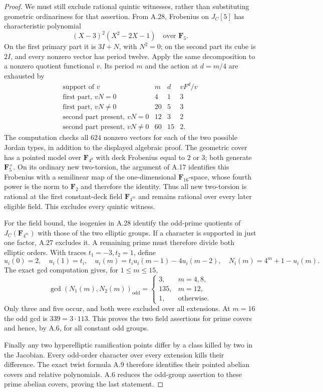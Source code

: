 \documentclass[11pt]{article}
\begin{document}
\begin{proof}
We must still exclude rational quintic witnesses, rather than
substituting geometric ordinariness for that assertion.  From A.28,
Frobenius on $J_C[5]$ has characteristic polynomial
\[
                   (X-3)^2(X^2-2X-1)\quad\text{over }\mathbf F_5.
\]
On the first primary part it is $3I+N$, with $N^2=0$; on the second
part its cube is $2I$, and every nonzero vector has period twelve.
Apply the same decomposition to a nonzero quotient functional $v$.
Its period $m$ and the action at $d=m/4$ are exhausted by
\[
 \begin{array}{c|c|c|c}
 \text{support of }v&m&d&vF^d/v\\\hline
 \text{first part, }vN=0&4&1&3\\
 \text{first part, }vN\ne0&20&5&3\\
 \text{second part present, }vN=0&12&3&2\\
 \text{second part present, }vN\ne0&60&15&2.
 \end{array}
\]
The computation checks all $624$ nonzero vectors for each of the two
possible Jordan types, in addition to the displayed algebraic proof.
The geometric cover has a pointed model over $\mathbf F_{4^d}$ with
deck Frobenius equal to $2$ or $3$; both generate
$\mathbf F_5^\times$.  On its ordinary new two-torsion, the argument
of A.17 identifies this Frobenius with a semilinear map of the
one-dimensional $\mathbf F_{16}$-space, whose fourth power is the
norm to $\mathbf F_2$ and therefore the identity.  Thus all new
two-torsion is rational at the first constant-deck field
$\mathbf F_{4^m}$ and remains rational over every later eligible
field.  This excludes every quintic witness.

For the field bound, the isogenies in A.28 identify the odd-prime
quotients of $J_C(\mathbf F_{4^m})$ with those of the two elliptic
groups.  If a character is supported in just one factor, A.27
excludes it.  A remaining prime must therefore divide both elliptic
orders.  With traces $t_1=-3,t_2=1$, define
\[
 u_i(0)=2,\quad u_i(1)=t_i,\quad
 u_i(m)=t_i u_i(m-1)-4u_i(m-2),\quad
 N_i(m)=4^m+1-u_i(m).
\]
The exact gcd computation gives, for $1\le m\le15$,
\[
 \gcd(N_1(m),N_2(m))_{\mathrm{odd}}=
 \begin{cases}
 3,&m=4,8,\\
 135,&m=12,\\
 1,&\text{otherwise}.
 \end{cases}
\]
Only three and five occur, and both were excluded over all
extensions.  At $m=16$ the odd gcd is $339=3\cdot113$.
This proves the two field assertions for prime covers and hence,
by A.6, for all constant odd groups.

Finally any two hyperelliptic ramification points differ by a class
killed by two in the Jacobian.  Every odd-order character over every
extension kills their difference.  The exact twist formula A.9
therefore identifies their pointed abelian covers and relative
polynomials.  A.6 reduces the odd-group assertion to these prime
abelian covers, proving the last statement.
\end{proof}
\end{document}
